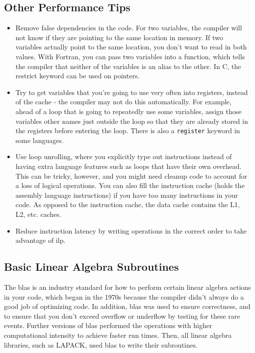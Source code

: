 \documentclass[10pt]{article}
\begin{document}
\begin{flushleft}
\subsection{Other Performance Tips}

\begin{itemize}
\item Remove false dependencies in the code. For two variables, the compiler will not know if they are pointing to the same location in memory. If two variables actually point to the same location, you don't want to read in both values. With Fortran, you can pass two variables into a function, which tells the compiler that neither of the variables is an alias to the other. In C, the restrict keyword can be used on pointers.
\item Try to get variables that you're going to use very often into registers, instead of the cache - the compiler may not do this automatically. For example, ahead of a loop that is going to repeatedly use some variables, assign those variables other names just outside the loop so that they are already stored in the registers before entering the loop. There is also a {\tt register} keyword in some languages.
\item Use loop unrolling, where you explicitly type out instructions instead of having extra language features such as loops that have their own overhead. This can be tricky, however, and you might need cleanup code to account for a loss of logical operations. You can also fill the instruction cache (holds the assembly language instructions) if you have too many instructions in your code. As opposed to the instruction cache, the data cache contains the L1, L2, etc. caches.
\item Reduce instruction latency by writing operations in the correct order to take advantage of \gls{ilp}.
\end{itemize}

\subsection{Basic Linear Algebra Subroutines}

The \gls{blas} is an industry standard for how to perform certain linear algebra actions in your code, which began in the 1970s because the compiler didn't always do a good job of optimizing code. In addition, \gls{blas} was used to ensure correctness, and to ensure that you don't exceed overflow or underflow by testing for these rare events. Further versions of \gls{blas} performed the operations with higher computational intensity to achieve faster run times. Then, all linear algebra libraries, such as LAPACK, used \gls{blas} to write their subroutines.


\end{flushleft}
\end{document}
